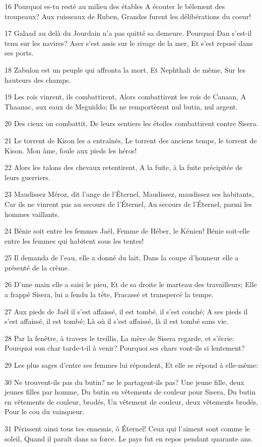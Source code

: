 \par 16 Pourquoi es-tu resté au milieu des étables A écouter le bêlement des troupeaux? Aux ruisseaux de Ruben, Grandes furent les délibérations du coeur!
\par 17 Galaad au delà du Jourdain n'a pas quitté sa demeure. Pourquoi Dan s'est-il tenu sur les navires? Aser s'est assis sur le rivage de la mer, Et s'est reposé dans ses ports.
\par 18 Zabulon est un peuple qui affronta la mort, Et Nephthali de même, Sur les hauteurs des champs.
\par 19 Les rois vinrent, ils combattirent, Alors combattirent les rois de Canaan, A Thaanac, aux eaux de Meguiddo; Ils ne remportèrent nul butin, nul argent.
\par 20 Des cieux on combattit, De leurs sentiers les étoiles combattirent contre Sisera.
\par 21 Le torrent de Kison les a entraînés, Le torrent des anciens temps, le torrent de Kison. Mon âme, foule aux pieds les héros!
\par 22 Alors les talons des chevaux retentirent, A la fuite, à la fuite précipitée de leurs guerriers.
\par 23 Maudissez Méroz, dit l'ange de l'Éternel, Maudissez, maudissez ses habitants, Car ils ne vinrent pas au secours de l'Éternel, Au secours de l'Éternel, parmi les hommes vaillants.
\par 24 Bénie soit entre les femmes Jaël, Femme de Héber, le Kénien! Bénie soit-elle entre les femmes qui habitent sous les tentes!
\par 25 Il demanda de l'eau, elle a donné du lait, Dans la coupe d'honneur elle a présenté de la crème.
\par 26 D'une main elle a saisi le pieu, Et de sa droite le marteau des travailleurs; Elle a frappé Sisera, lui a fendu la tête, Fracassé et transpercé la tempe.
\par 27 Aux pieds de Jaël il s'est affaissé, il est tombé, il s'est couché; A ses pieds il s'est affaissé, il est tombé; Là où il s'est affaissé, là il est tombé sans vie.
\par 28 Par la fenêtre, à travers le treillis, La mère de Sisera regarde, et s'écrie: Pourquoi son char tarde-t-il à venir? Pourquoi ses chars vont-ils si lentement?
\par 29 Les plus sages d'entre ses femmes lui répondent, Et elle se répond à elle-même:
\par 30 Ne trouvent-ils pas du butin? ne le partagent-ils pas? Une jeune fille, deux jeunes filles par homme, Du butin en vêtements de couleur pour Sisera, Du butin en vêtements de couleur, brodés, Un vêtement de couleur, deux vêtements brodés, Pour le cou du vainqueur.
\par 31 Périssent ainsi tous tes ennemis, ô Éternel! Ceux qui l'aiment sont comme le soleil, Quand il paraît dans sa force. Le pays fut en repos pendant quarante ans.

